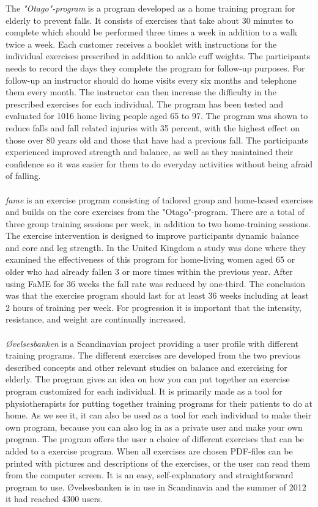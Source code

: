 The \emph{"Otago"-program} is a program developed as a home training program for elderly to prevent falls. It consists of exercises that take about 30 minutes to complete which should be performed three times a week in addition to a walk twice a week. Each customer receives a booklet with instructions for the individual exercises prescribed in addition to ankle cuff weights. The participants needs to record the days they complete the program for follow-up purposes. For follow-up an instructor should do home visits every six months and telephone them every month. The instructor can then increase the difficulty in the prescribed exercises for each individual. The program has been tested and evaluated for 1016 home living people aged 65 to 97. The program was shown to reduce falls and fall related injuries with 35 percent, with the highest effect on those over 80 years old and those that have had a previous fall. The participants experienced improved strength and balance, as well as they maintained their confidence so it was easier for them to do everyday activities without being afraid of falling. \cite{otago} \cite{gruppetrening-trheim}\\ \\
\emph{\ac{fame}} is an exercise program consisting of tailored group and home-based exercises and builds on the core exercises from the "Otago"-program.  There are a total of three group training sessions per week, in addition to two home-training sessions. The exercise intervention is designed to improve participants dynamic balance and core and leg strength.  In the United Kingdom a study was done where they examined the effectiveness of this program for home-living women aged 65 or older who had already fallen 3 or more times within the previous year. After using FaME for 36 weeks the fall rate was reduced by one-third. The conclusion was that the exercise program should last for at least 36 weeks including at least 2 hours of training per week. For progression it is important that the intensity, resistance, and weight are continually increased.\cite{fame}\\ \\
\emph{{Ø}velsesbanken} is a Scandinavian project providing a user profile with different training programs. The different exercises are developed from the two previous described concepts and other relevant studies on balance and exercising for elderly. The program gives an idea on how you can put together an exercise program customized for each individual. It is primarily made as a tool for physiotherapists for putting together training programs for their patients to do at home. As we see it, it can also be used as a tool for each individual to make their own program, because you can also log in as a private user and make your own program. The program offers the user a choice of different exercises that can be added to a exercise program. When all exercises are chosen PDF-files can be printed with pictures and descriptions of the exercises, or the user can read them from the computer screen. It is an easy, self-explanatory and straightforward program to use. {Ø}velsesbanken is in use in Scandinavia and the summer of 2012 it had reached 4300 users. \cite{ovelsesbank}\\ \\

